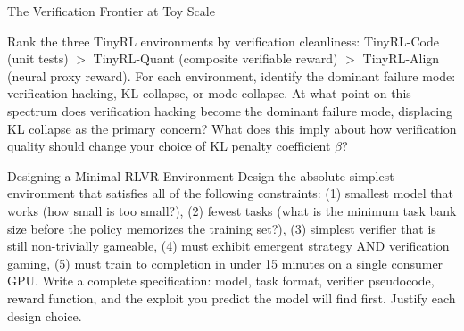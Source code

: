 \begin{thinkfirst}{The Verification Frontier at Toy Scale}
\begin{center}
\end{center}

\medskip
Rank the three TinyRL environments by verification cleanliness: TinyRL-Code (unit tests) $>$ TinyRL-Quant (composite verifiable reward) $>$ TinyRL-Align (neural proxy reward). For each environment, identify the dominant failure mode: verification hacking, KL collapse, or mode collapse. At what point on this spectrum does verification hacking become the dominant failure mode, displacing KL collapse as the primary concern? What does this imply about how verification quality should change your choice of KL penalty coefficient $\beta$?
\end{thinkfirst}

\begin{thinkfirst}{Designing a Minimal RLVR Environment}
Design the absolute simplest environment that satisfies all of the following constraints: (1) smallest model that works (how small is too small?), (2) fewest tasks (what is the minimum task bank size before the policy memorizes the training set?), (3) simplest verifier that is still non-trivially gameable, (4) must exhibit emergent strategy AND verification gaming, (5) must train to completion in under 15 minutes on a single consumer GPU. Write a complete specification: model, task format, verifier pseudocode, reward function, and the exploit you predict the model will find first. Justify each design choice.
\end{thinkfirst}


